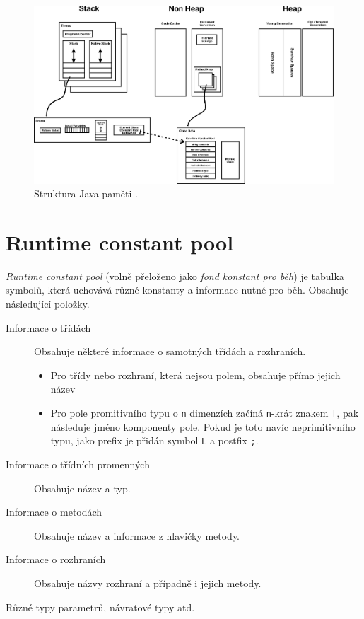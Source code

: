 \begin{figure}[h]
	\centering
	\includegraphics[scale=0.1]{obrazky/JVM_Internal_Architecture.png}
	\caption{Struktura Java paměti \cite{jvms-img}.}
	\label{obr-jvms-img}
\end{figure}

\section{Runtime constant pool}
\label{runtime-constant-pool}
\textit{Runtime constant pool} (volně přeloženo jako \textit{fond konstant pro běh}) je tabulka symbolů, která uchovává různé konstanty a informace nutné pro běh. Obsahuje následující položky.

\begin{description}
    \item[Informace o třídách] Obsahuje některé informace o samotných třídách a rozhraních.
        \begin{itemize}
            \item Pro třídy nebo rozhraní, která nejsou polem, obsahuje přímo jejich název
            \item Pro pole promitivního typu o \texttt{n} dimenzích začíná \texttt{n}-krát znakem \texttt{[}, pak následuje jméno komponenty pole. Pokud je toto navíc neprimitivního typu, jako prefix je přidán symbol \texttt{L} a postfix \texttt{;}.
        \end{itemize}
    \item[Informace o třídních promenných] Obsahuje název a typ.
    \item[Informace o metodách] Obsahuje název a informace z hlavičky metody.
    \item[Informace o rozhraních] Obsahuje názvy rozhraní a případně i jejich metody.   
    \item[Různé typy parametrů, návratové typy atd.]  
\end{description}

